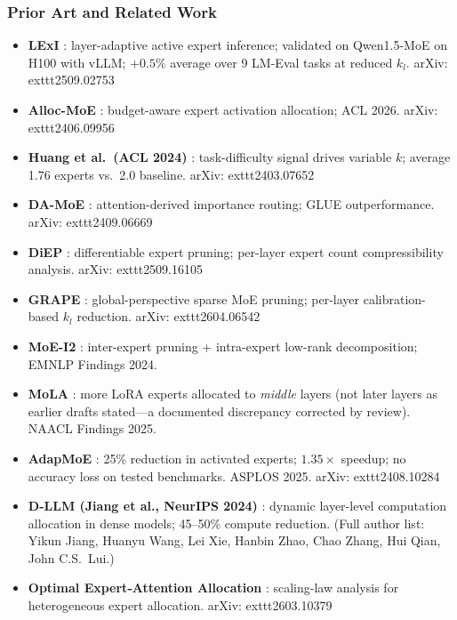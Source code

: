 \documentclass[11pt]{article}
\begin{document}
\subsubsection*{Prior Art and Related Work}
\begin{itemize}
  \item \textbf{LExI} \cite{ChittyVenkataEtAl2025}: layer-adaptive active expert inference; validated on Qwen1.5-MoE on H100 with vLLM; $+0.5\%$ average over 9 LM-Eval tasks at reduced $k_l$.
    arXiv:	exttt{2509.02753}

  \item \textbf{Alloc-MoE} \cite{LiuEtAl2026}: budget-aware expert activation allocation; ACL 2026.
    arXiv:	exttt{2406.09956}

  \item \textbf{Huang et al.\ (ACL 2024)} \cite{HuangAnEtAl2024}: task-difficulty signal drives variable $k$; average 1.76 experts vs.\ 2.0 baseline.
    arXiv:	exttt{2403.07652}

  \item \textbf{DA-MoE} \cite{AkhavanAghdamEtAl2024}: attention-derived importance routing; GLUE outperformance.
    arXiv:	exttt{2409.06669}

  \item \textbf{DiEP} \cite{BaiEtAl2025}: differentiable expert pruning; per-layer expert count compressibility analysis.
    arXiv:	exttt{2509.16105}

  \item \textbf{GRAPE} \cite{ZhangEtAl2026}: global-perspective sparse MoE pruning; per-layer calibration-based $k_l$ reduction.
    arXiv:	exttt{2604.06542}

  \item \textbf{MoE-I2} \cite{YangEtAl2024MoEI2}: inter-expert pruning + intra-expert low-rank decomposition; EMNLP Findings 2024.

  \item \textbf{MoLA} \cite{GaoEtAl2025MoLA}: more LoRA experts allocated to \emph{middle} layers (not later layers as earlier drafts stated---a documented discrepancy corrected by review).
    NAACL Findings 2025.

  \item \textbf{AdapMoE} \cite{ZhongEtAl2024}: 25\% reduction in activated experts; $1.35\times$ speedup; no accuracy loss on tested benchmarks.
    ASPLOS 2025.
    arXiv:	exttt{2408.10284}

  \item \textbf{D-LLM (Jiang et al., NeurIPS 2024)} \cite{JiangWangEtAl2024}: dynamic layer-level computation allocation in dense models; 45--50\% compute reduction.
    (Full author list: Yikun Jiang, Huanyu Wang, Lei Xie, Hanbin Zhao, Chao Zhang, Hui Qian, John C.S.\ Lui.)

  \item \textbf{Optimal Expert-Attention Allocation} \cite{LiEtAl2026}: scaling-law analysis for heterogeneous expert allocation.
    arXiv:	exttt{2603.10379}
\end{itemize}
\end{document}
